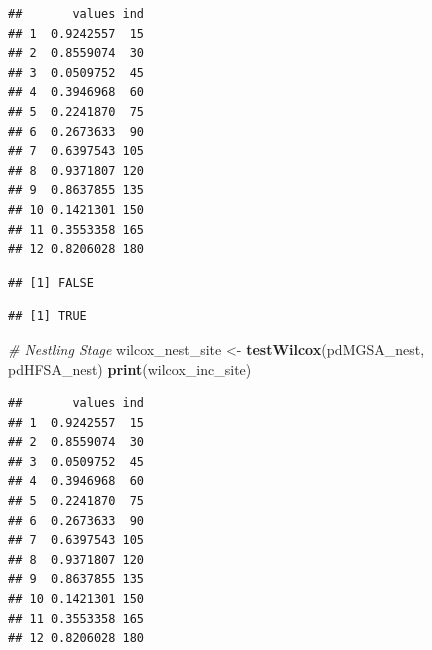 \documentclass[]{article}
\newenvironment{Shaded}{\begin{snugshade}}{\end{snugshade}}
\newcommand{\CommentTok}[1]{\textcolor[rgb]{0.56,0.35,0.01}{\textit{#1}}}
\newcommand{\FloatTok}[1]{\textcolor[rgb]{0.00,0.00,0.81}{#1}}
\newcommand{\KeywordTok}[1]{\textcolor[rgb]{0.13,0.29,0.53}{\textbf{#1}}}
\newcommand{\NormalTok}[1]{#1}
\newcommand{\OperatorTok}[1]{\textcolor[rgb]{0.81,0.36,0.00}{\textbf{#1}}}
\newcommand{\StringTok}[1]{\textcolor[rgb]{0.31,0.60,0.02}{#1}}
\begin{document}
\begin{verbatim}
##       values ind
## 1  0.9242557  15
## 2  0.8559074  30
## 3  0.0509752  45
## 4  0.3946968  60
## 5  0.2241870  75
## 6  0.2673633  90
## 7  0.6397543 105
## 8  0.9371807 120
## 9  0.8637855 135
## 10 0.1421301 150
## 11 0.3553358 165
## 12 0.8206028 180
\end{verbatim}

\begin{Shaded}
\end{Shaded}

\begin{verbatim}
## [1] FALSE
\end{verbatim}

\begin{Shaded}
\end{Shaded}

\begin{verbatim}
## [1] TRUE
\end{verbatim}

\begin{Shaded}
\begin{Highlighting}[]
\CommentTok{# Nestling Stage}
\NormalTok{wilcox_nest_site <-}\StringTok{ }\KeywordTok{testWilcox}\NormalTok{(pdMGSA_nest, pdHFSA_nest)}
\KeywordTok{print}\NormalTok{(wilcox_inc_site)}
\end{Highlighting}
\end{Shaded}

\begin{verbatim}
##       values ind
## 1  0.9242557  15
## 2  0.8559074  30
## 3  0.0509752  45
## 4  0.3946968  60
## 5  0.2241870  75
## 6  0.2673633  90
## 7  0.6397543 105
## 8  0.9371807 120
## 9  0.8637855 135
## 10 0.1421301 150
## 11 0.3553358 165
## 12 0.8206028 180
\end{verbatim}

\begin{Shaded}
\end{Shaded}
\end{document}
